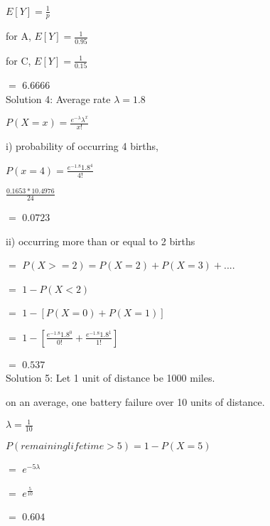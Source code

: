 \documentclass{article}
\begin{document}
$E\left [ Y  \right ] = \frac{1}{p}$

for A, $ E\left [ Y \right ] = \frac{1}{0.95} $

for C, $E\left [ Y \right ] = \frac{1}{0.15}$

$=$ $6.6666$\\

Solution 4:
Average rate $\lambda = 1.8$

$P\left ( X=x \right ) = \frac{e^{-\lambda }\lambda ^x}{x!}$

i) probability of occurring 4 births,

$P\left ( x=4 \right ) = \frac{e^{-1.8}1.8^4}{4!}$

$\frac{0.1653*10.4976}{24}$

$=$ $0.0723$

ii) occurring more than or equal to 2 births

$=$ $P\left ( X>=2 \right ) = P\left ( X=2 \right ) + P\left ( X=3 \right ) + ....$

$=$ $1-P\left ( X<2 \right )$

$=$ $1-\left [ P\left ( X=0 \right ) + P\left ( X=1 \right )\right ]$

$=$ $1-\left [ \frac{e^{-1.8}1.8^0}{0!}  + \frac{e^{-1.8}1.8^1}{1!}\right ]$

$=$ $0.537$\\

Solution 5:
Let 1 unit of distance be 1000 miles.

on an average, one battery failure over 10 units of distance.

$\lambda = \frac{1}{10}$

$P\left ( remaininglifetime > 5 \right ) = 1-P\left ( X=5 \right )$

$=$ $e^{-5\lambda }$

$=$ $e^{\frac{5}{10} }$

$=$ $0.604$
\end{document}

